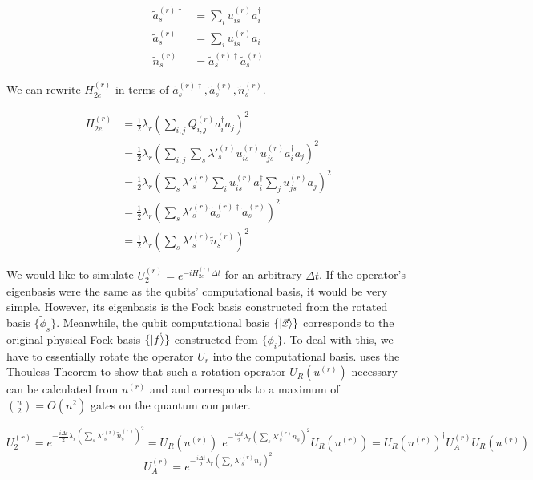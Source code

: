 \begin{equation}
    \begin{split}
        \tilde{a}^{(r)\dag}_s &= \sum_iu^{(r)}_{is}a^\dag_i \\
        \tilde{a}^{(r)}_s &= \sum_iu^{(r)}_{is}a_i \\
        \tilde{n}^{(r)}_s &= \tilde{a}^{(r)\dag}_s\tilde{a}^{(r)}_s
    \end{split}
\end{equation}

We can rewrite $H_{2e}^{(r)}$ in terms of $\tilde{a}^{(r)\dag}_s, \tilde{a}^{(r)}_s, \tilde{n}^{(r)}_s$.

\begin{equation}
    \begin{split}
        H_{2e}^{(r)} &= \frac{1}{2}\lambda_r\left(\sum_{i,j} Q^{(r)}_{i, j}a^\dag_ia_j\right)^2 \\
        &= \frac{1}{2}\lambda_r\left(\sum_{i,j} \sum_s \lambda'^{(r)}_s u^{(r)}_{is}u^{(r)}_{js}a^\dag_ia_j\right)^2 \\
        &= \frac{1}{2}\lambda_r\left(\sum_s \lambda'^{(r)}_s \sum_i u^{(r)}_{is}a^\dag_i\sum_ju^{(r)}_{js}a_j\right)^2 \\
        &= \frac{1}{2}\lambda_r\left(\sum_s \lambda'^{(r)}_s \tilde{a}^{(r)\dag}_s\tilde{a}^{(r)}_s\right)^2 \\
        &= \frac{1}{2}\lambda_r\left(\sum_s \lambda'^{(r)}_s \tilde{n}^{(r)}_s\right)^2
    \end{split}
\end{equation}

We would like to simulate $U_2^{(r)} = e^{-iH_{2e}^{(r)}\Delta t}$ for an arbitrary $\Delta t$. If the operator's eigenbasis were the same as the qubits' computational basis, it would be very simple. However, its eigenbasis is the Fock basis constructed from the rotated basis $\{\tilde{\phi}_s\}$. Meanwhile, the qubit computational basis $\{\ket{\vec{x}}\}$ corresponds to the original physical Fock basis $\{\ket{\vec{f}}\}$ constructed from $\{\phi_i\}$. To deal with this, we have to essentially rotate the operator $U_r$ into the computational basis. \cite{FSN} uses the Thouless Theorem to show that such a rotation operator $U_R(u^{(r)})$ necessary can be calculated from $u^{(r)}$ and and corresponds to a maximum of ${n \choose 2} = O(n^2)$ gates on the quantum computer. 

\begin{equation}
    U_2^{(r)} = e^{-\frac{i\Delta t}{2}\lambda_r\left(\sum_s \lambda'^{(r)}_s \tilde{n}^{(r)}_s\right)^2} = U_R(u^{(r)})^\dag e^{-\frac{i\Delta t}{2}\lambda_r\left(\sum_s \lambda'^{(r)}_s n_s\right)^2}U_R(u^{(r)}) = U_R(u^{(r)})^\dag U_A^{(r)}U_R(u^{(r)})
    \label{eq: U_2^r}
\end{equation}
\begin{equation}
    U_A^{(r)} = e^{-\frac{i\Delta t}{2}\lambda_r\left(\sum_s \lambda'^{(r)}_s n_s\right)^2}
\end{equation}

